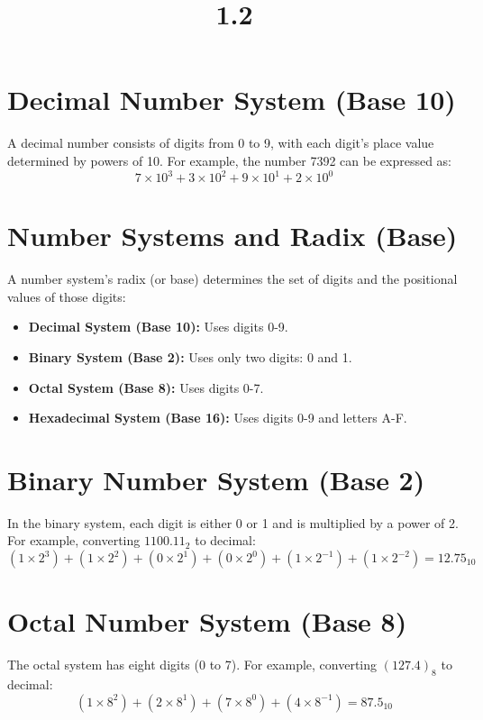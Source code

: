 \documentclass{article}
\begin{document}
\title{1.2}
\author{}
\date{}
\maketitle

\section{Decimal Number System (Base 10)}
A decimal number consists of digits from 0 to 9, with each digit's place value determined by powers of 10.
For example, the number 7392 can be expressed as:
\begin{equation}
  7 \times 10^3 + 3 \times 10^2 + 9 \times 10^1 + 2 \times 10^0
\end{equation}

\section{Number Systems and Radix (Base)}
A number system's radix (or base) determines the set of digits and the positional values of those digits:
\begin{itemize}
    \item \textbf{Decimal System (Base 10):} Uses digits 0-9.
    \item \textbf{Binary System (Base 2):} Uses only two digits: 0 and 1.
    \item \textbf{Octal System (Base 8):} Uses digits 0-7.
    \item \textbf{Hexadecimal System (Base 16):} Uses digits 0-9 and letters A-F.
\end{itemize}

\section{Binary Number System (Base 2)}
In the binary system, each digit is either 0 or 1 and is multiplied by a power of 2.
For example, converting $1100.11_2$ to decimal:
\begin{equation}
  (1 \times 2^3) + (1 \times 2^2) + (0 \times 2^1) + (0 \times 2^0) + (1 \times 2^{-1}) + (1 \times 2^{-2}) = 12.75_{10}
\end{equation}

\section{Octal Number System (Base 8)}
The octal system has eight digits (0 to 7). For example, converting $(127.4)_8$ to decimal:
\begin{equation}
  (1 \times 8^2) + (2 \times 8^1) + (7 \times 8^0) + (4 \times 8^{-1}) = 87.5_{10}
\end{equation}
\end{document}
